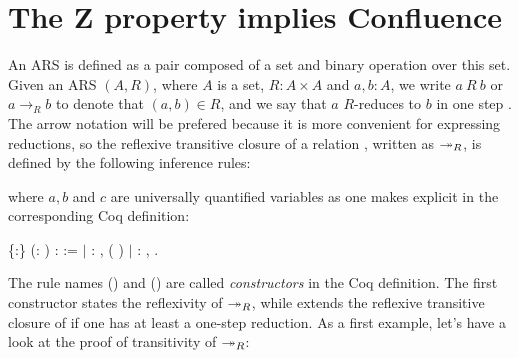 \section{The Z property implies Confluence}




  An ARS is defined as a pair composed of a set and binary operation
  over this set. Given an ARS $(A,R)$, where $A$ is a set, $R:A\times
  A$ and $a,b: A$, we write $a\ R\ b$ or $a\to_R b$ to denote that
  $(a,b)\in R$, and we say that $a$ $R$-reduces to $b$ in one step
  . The arrow notation will be prefered because it is more convenient
  for expressing reductions, so the reflexive transitive closure of a
  relation , written as $\twoheadrightarrow_R$, is defined by the following
  inference rules:  \noindent where $a,b$ and $c$
  are universally quantified variables as one makes explicit in the
  corresponding Coq definition: \begin{coqdoccode}
\coqdocemptyline
\coqdocnoindent
{}  \{:\} (:  ) :      :=\coqdoceol
\coqdocnoindent
\ensuremath{|} : \coqdockw{\ensuremath{\forall}} , ( )  \coqdoceol
\coqdocnoindent
\ensuremath{|} : \coqdockw{\ensuremath{\forall}}   ,             .\coqdoceol
\coqdocemptyline
\end{coqdoccode}
The rule names () and () are called \textit{constructors}
in the Coq definition. The first constructor states the reflexivity of
$\twoheadrightarrow_R$, while  extends the reflexive transitive closure of
 if one has at least a one-step reduction. As a first example,
let's have a look at the proof of transitivity of $\twoheadrightarrow_R$:


